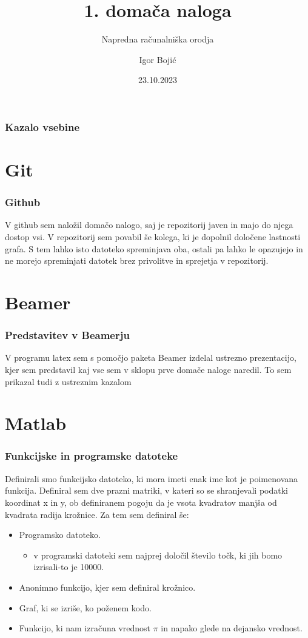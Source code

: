 \documentclass{beamer}
\title{1. domača naloga}
\subtitle{Napredna računalniška orodja}
\author{Igor Bojić}
\institute{Fakulteta za strojništvo}
\date{23.10.2023}
\begin{document}
\frame{\titlepage}
\begin{frame}
    \frametitle{Kazalo vsebine}
    \tableofcontents
\end{frame}
  

\section{Git}
\begin{frame}
\frametitle{Github}
\justifying
V github sem naložil domačo nalogo, saj je repozitorij javen in majo do njega dostop vsi. V repozitorij sem povabil še kolega, ki je dopolnil določene lastnosti grafa. S tem lahko isto datoteko spreminjava oba, ostali pa lahko le opazujejo in ne morejo spreminjati datotek brez privolitve in sprejetja v repozitorij.
\end{frame}

\section{Beamer}

\begin{frame}
\frametitle{Predstavitev v Beamerju}
\justifying
V programu latex sem s pomočjo paketa Beamer izdelal ustrezno prezentacijo, kjer sem predstavil kaj vse sem v sklopu prve domače naloge naredil. To sem prikazal tudi z ustreznim kazalom 
\end{frame}


\section{Matlab}

\begin{frame}
\frametitle{Funkcijske in programske datoteke}

Definirali smo funkcijsko datoteko, ki mora imeti enak ime kot je poimenovana funkcija. Definiral sem dve prazni matriki, v kateri so se shranjevali podatki koordinat x in y, ob definiranem pogoju da je vsota kvadratov manjša od  kvadrata radija krožnice. Za tem sem definiral še:
\begin{itemize}
    \item Programsko datoteko.
    \begin{itemize}
        \item v programski datoteki sem najprej določil število točk, ki jih bomo izrisali-to je 10000.
        \end{itemize}
    \item Anonimno funkcijo, kjer sem definiral krožnico.
    \item Graf, ki se izriše, ko poženem kodo.
    \item Funkcijo, ki nam izračuna vrednost $\pi$ in napako glede na dejansko vrednost. 
\end{itemize}
\end{frame}
\end{document}
